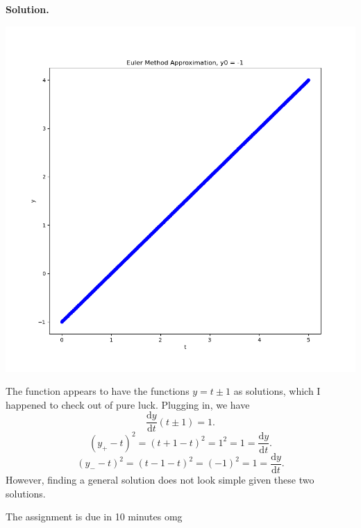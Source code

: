 \documentclass[11pt, letterpaper]{report}
\newenvironment{soln}[1][]{\noindent\textbf{Solution. }}{\hfill\qedsymbol}
\begin{document}
\begin{soln}
\begin{center}
		\includegraphics[scale=0.5]{SuperEuler11.png}
	\end{center}
	The function appears to have the functions $y=t\pm 1$ as solutions, which I happened to check out of pure luck. Plugging in, we have
	\[
		\frac{\mathrm{d}y}{\mathrm{d}t} \left( t\pm1 \right) =1
	.\]
	\[
		(y_+-t)^2 = (t+1-t)^2 = 1^2 = 1 = \frac{\mathrm{d}y}{\mathrm{d}t} 
	.\]
	\[
		(y_- -t)^2 = (t-1-t)^2 = (-1)^2 = 1 = \frac{\mathrm{d}y}{\mathrm{d}t} 
	.\]
	However, finding a general solution does not look simple given these two solutions.

	The assignment is due in 10 minutes omg


\end{soln}
\end{document}
